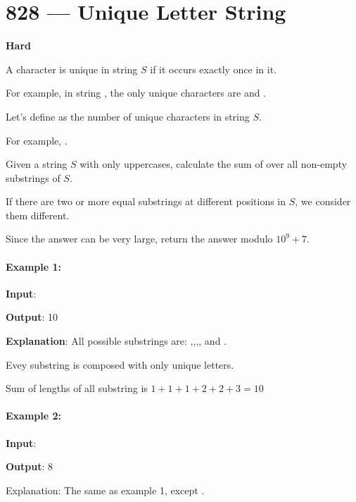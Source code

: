 \section{828 --- Unique Letter String}

\textbf{Hard}

A character is unique in string $S$ if it occurs exactly once in it.

For example, in string , the only unique characters are  and .

Let's define  as the number of unique characters in string $S$.

For example, .

Given a string $S$ with only uppercases, calculate the sum of  over all non-empty substrings of $S$.

If there are two or more equal substrings at different positions in $S$, we consider them different.

Since the answer can be very large, return the answer modulo $10 ^ 9 + 7$.

 

\paragraph{Example 1:}

\begin{flushleft}
\textbf{Input}: 

\textbf{Output}: 10

\textbf{Explanation}: All possible substrings are: ,,,, and .

Evey substring is composed with only unique letters.

Sum of lengths of all substring is $1 + 1 + 1 + 2 + 2 + 3 = 10$
\end{flushleft}

\paragraph{Example 2:}

\begin{flushleft}
\textbf{Input}: 

\textbf{Output}: 8

Explanation: The same as example 1, except .
\end{flushleft}

